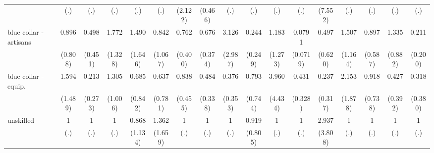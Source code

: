 {\begin{tabular}{l*{16}{c}}
                    &         (.)         &         (.)         &         (.)         &         (.)         &         (.)         &     (2.122)         &     (0.466)         &         (.)         &         (.)         &         (.)         &         (.)         &     (7.552)         &         (.)         &         (.)         &         (.)         &         (.)         \\
[1em]
blue collar - artisans&       0.896         &       0.498         &       1.772         &       1.490         &       0.842         &       0.762         &       0.676         &       3.126         &       0.244         &       1.183         &      0.0791\sym{**} &       0.497         &       1.507         &       0.897         &       1.335         &       0.211         \\
                    &     (0.808)         &     (0.451)         &     (1.328)         &     (1.646)         &     (1.067)         &     (0.400)         &     (0.374)         &     (2.987)         &     (0.249)         &     (1.273)         &    (0.0719)         &     (0.620)         &     (1.164)         &     (0.587)         &     (0.882)         &     (0.200)         \\
[1em]
blue collar - equip.&       1.594         &       0.213         &       1.305         &       0.685         &       0.637         &       0.838         &       0.484         &       0.376         &       0.793         &       3.960         &       0.431         &       0.237         &       2.153         &       0.918         &       0.427         &       0.318         \\
                    &     (1.489)         &     (0.273)         &     (1.006)         &     (0.842)         &     (0.781)         &     (0.455)         &     (0.338)         &     (0.353)         &     (0.744)         &     (4.434)         &     (0.328)         &     (0.317)         &     (1.878)         &     (0.738)         &     (0.392)         &     (0.380)         \\
[1em]
unskilled           &           1         &           1         &           1         &       0.868         &       1.362         &           1         &           1         &           1         &       0.919         &           1         &           1         &       2.937         &           1         &           1         &           1         &           1         \\
                    &         (.)         &         (.)         &         (.)         &     (1.134)         &     (1.659)         &         (.)         &         (.)         &         (.)         &     (0.805)         &         (.)         &         (.)         &     (3.808)         &         (.)         &         (.)         &         (.)         &         (.)         \\

\end{tabular}}

